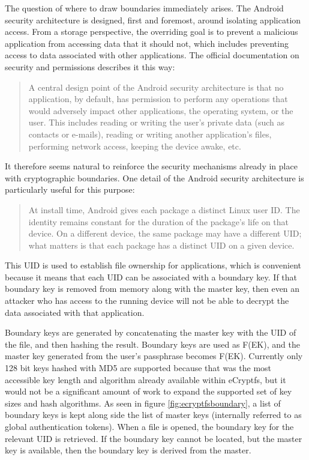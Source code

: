 The question of where to draw boundaries immediately arises. The Android security architecture is designed, first and foremost,
around isolating application access. From a storage perspective, the overriding goal is to prevent a malicious application from
accessing data that it should not, which includes preventing access to data associated with other applications.  The official
documentation on security and permissions describes it this way: \begin{quote} A central design point of the Android security
architecture is that no application, by default, has permission to perform any operations that would adversely impact other
applications, the operating system, or the user.  This includes reading or writing the user's private data (such as contacts or
e-mails), reading or writing another application's files, performing network access, keeping the device awake, etc.
\hspace{\fill}\cite{securitydoc} \end{quote} It therefore seems natural to reinforce the security mechanisms already in place with
cryptographic boundaries.  One detail of the Android security architecture is particularly useful for this purpose: \begin{quote} At
install time, Android gives each package a distinct Linux user ID. The identity remains constant for the duration of the package's
life on that device. On a different device, the same package may have a different UID; what matters is that each package has a
distinct UID on a given device.  \hspace{\fill}\cite{securitydoc} \end{quote} This UID is used to establish file ownership for
applications, which is convenient because it means that each UID can be associated with a boundary key. If that boundary key is
removed from memory along with the master key, then even an attacker who has access to the running device will not be able to
decrypt the data associated with that application.

Boundary keys are generated by concatenating the master key with the UID of the file, and then hashing the result.  Boundary keys
are used as F(EK), and the master key generated from the user's passphrase becomes F(EK). Currently
only 128 bit keys hashed with MD5 are supported because that was the most accessible key length and algorithm already available
within eCryptfs, but it would not be a significant amount of work to expand the supported set of key sizes and hash algorithms. As
seen in figure \ref{fig:ecryptfsboundary}, a list of boundary keys is kept along side the list of master keys (internally referred
to as global authentication tokens).  When a file is opened, the boundary key for the relevant UID is retrieved. If the boundary key
cannot be located, but the master key is available, then the boundary key is derived from the master.

